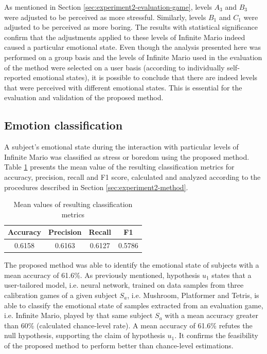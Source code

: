 As mentioned in Section \ref{sec:experiment2-evaluation-game}, levels $A_3$ and $B_3$ were adjusted to be perceived as more stressful. Similarly, levels $B_1$ and $C_1$ were adjusted to be perceived as more boring. The results with statistical significance confirm that the adjustments applied to these levels of Infinite Mario indeed caused a particular emotional state. Even though the analysis presented here was performed on a group basis and the levels of Infinite Mario used in the evaluation of the method were selected on a user basis (according to individually self-reported emotional states), it is possible to conclude that there are indeed levels that were perceived with different emotional states. This is essential for the evaluation and validation of the proposed method.

\subsection{Emotion classification}

A subject's emotional state during the interaction with particular levels of Infinite Mario was classified as stress or boredom using the proposed method. Table \ref{table:experiment2-result-metrics-mean} presents the mean value of the resulting classification metrics for accuracy, precision, recall and F1 score, calculated and analyzed according to the procedures described in Section \ref{sec:experiment2-method}.

\begin{table}[ht]
    \centering
    \caption{Mean values of resulting classification metrics}
    \label{table:experiment2-result-metrics-mean}
    \begin{tabular}[l]{@{}cccc}
        \toprule%
            \textbf{Accuracy} & \textbf{Precision} & \textbf{Recall} & \textbf{F1}\\
        \midrule%
            0.6158 & 0.6163 & 0.6127 & 0.5786 \\ %
        \bottomrule%
    \end{tabular}
\end{table}

The proposed method was able to identify the emotional state of subjects with a mean accuracy of 61.6\%. As previously mentioned, hypothesis $u_1$ states that a user-tailored model, i.e. neural network, trained on data samples from three calibration games of a given subject $S_a$, i.e. Mushroom, Platformer and Tetris, is able to classify the emotional state of samples extracted from an evaluation game, i.e. Infinite Mario, played by that same subject $S_a$ with a mean accuracy greater than 60\% (calculated chance-level rate). A mean accuracy of 61.6\% refutes the null hypothesis, supporting the claim of hypothesis $u_1$. It confirms the feasibility of the proposed method to perform better than chance-level estimations.

